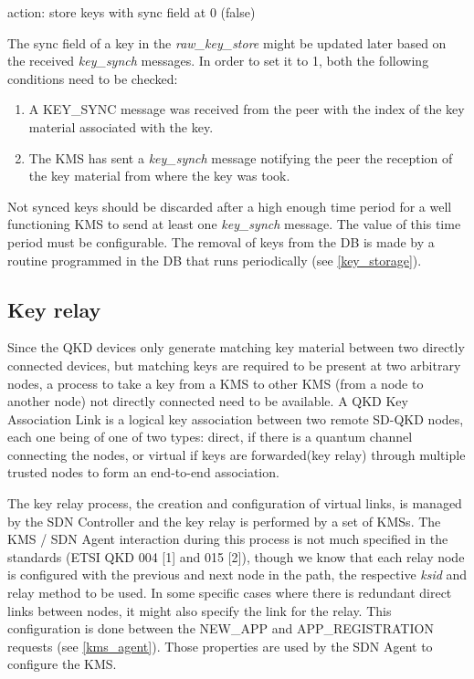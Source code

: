\begin{refsection}
\begin{itemize}
action: store keys with sync field at 0 (false)
\end{itemize}

The sync field of a key in the \textit{raw\_key\_store} might be updated later based on the received \textit{key\_synch} messages. In order to set it to 1, both the following conditions need to be checked:
\begin{enumerate}
	\item A KEY\_SYNC message was received from the peer with the index of the key material associated with the key.
	\item The \ac{KMS} has sent a \textit{key\_synch} message notifying the peer the reception of the key material from where the key was took. 
\end{enumerate}

Not synced keys should be discarded after a high enough time period for a well functioning \ac{KMS} to send at least one \textit{key\_synch} message. The value of this time period must be configurable. The removal of keys from the \ac{DB} is made by a routine programmed in the \ac{DB} that runs periodically (see \ref{key_storage}).


\subsection{Key relay}
\label{kms_key_relay}

Since the QKD devices only generate matching key material between two directly connected devices, but matching keys are required to be present at two arbitrary nodes, a process to take a key from a \ac{KMS} to other \ac{KMS} (from a node to another node) not directly connected need to be available. A QKD Key Association Link is a logical key association between two remote SD-QKD nodes, each one being of one of two types: direct, if there is a quantum channel connecting the nodes, or virtual if keys are forwarded(key relay) through multiple trusted nodes to form an end-to-end association.

The key relay process, the creation and configuration of virtual links, is managed by the SDN Controller and the key relay is performed by a set of \ac{KMS}s. The KMS / SDN Agent interaction during this process is not much specified in the standards (ETSI QKD 004 [1] and 015 [2]), though we know that each relay node is configured with the previous and next node in the path, the respective \textit{ksid} and relay method to be used. In some specific cases where there is redundant direct links between nodes, it might also specify the link for the relay. This configuration is done between the NEW\_APP and APP\_REGISTRATION requests (see \ref{kms_agent}). Those properties are used by the SDN Agent to configure the \ac{KMS}.


\end{refsection}

